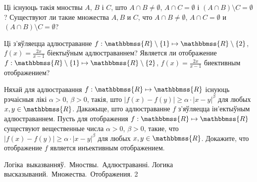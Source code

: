 \begin{problemList}
\problemItemSimple
{Ці існуюць такія мноствы $A$, $B$ і $C$, што $A \cap B \neq \emptyset$, $A \cap C = \emptyset$ і $(A \cap B) \setminus C = \emptyset$?}
{Существуют ли такие множества $A, B$ и $C$, что $A \cap B \neq \emptyset$, $A \cap C = \emptyset$ и $(A \cap B) \setminus C = \emptyset$?}

\problemItemSimple
{Ці з'яўляецца адлюстраванне $f: \mathbbmss{R} \setminus \{1\} \mapsto \mathbbmss{R} \setminus \{2\}$, $f(x) = \frac{2 x}{x - 1}$ біектыўным адлюстраваннем?}
{Является ли отображение $f: \mathbbmss{R} \setminus \{1\} \mapsto \mathbbmss{R} \setminus \{2\}$, $f(x) = \frac{2 x}{x - 1}$ биективным отображением?}

\problemItemSimple
{Няхай для адлюстравання $f: \mathbbmss{R} \mapsto \mathbbmss{R}$ існуюць рэчаісныя лікі $\alpha > 0$, $\beta > 0$, такія, што $|f(x) - f(y)| \geq \alpha \cdot |x - y|^{\beta}$ для любых $x, y \in \mathbbmss{R}$. Дакажыце, што адлюстраванне $f$ з'яўляецца ін'ектыўным адлюстраваннем.}
{Пусть для отображения $f: \mathbbmss{R} \mapsto \mathbbmss{R}$ существуют вещественные числа $\alpha > 0$, $\beta > 0$, такие, что $|f(x) - f(y)| \geq \alpha \cdot |x - y|^{\beta}$ для любых $x, y \in \mathbbmss{R}$. Докажите, что отображение $f$ является инъективным отображением.}

\end{problemList}

\newpage

\quizTitle
{Логіка~выказванняў.~Мноствы.~Адлюстраванні.}
{Логика высказываний.~Множества.~Отображения.}
{2}

